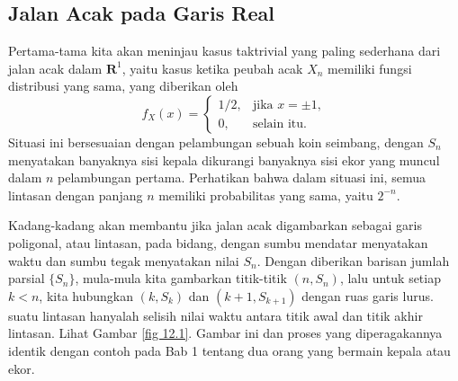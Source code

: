 \subsection*{Jalan Acak pada Garis Real}
Pertama-tama kita akan meninjau kasus taktrivial yang paling sederhana
dari jalan acak dalam ${\mathbf R}^1$, yaitu kasus ketika peubah acak $X_n$
memiliki fungsi distribusi yang sama, yang diberikan oleh
$$
f_X(x) = \left \{ \begin{array}{ll}
                        1/2, & \mbox{jika $x = \pm 1,$} \\
                          0, & \mbox{selain itu.} 
                  \end{array}
         \right.  
$$
Situasi ini bersesuaian dengan pelambungan sebuah koin seimbang, dengan $S_n$ menyatakan banyaknya
sisi kepala dikurangi banyaknya sisi ekor yang muncul dalam $n$ pelambungan pertama.  Perhatikan bahwa dalam
situasi ini, semua lintasan dengan panjang $n$ memiliki probabilitas yang sama, yaitu $2^{-n}$.
\par
Kadang-kadang akan membantu jika jalan acak digambarkan sebagai garis poligonal, atau lintasan, pada
bidang, dengan sumbu mendatar menyatakan waktu dan sumbu tegak menyatakan nilai
$S_n$.  Dengan diberikan barisan jumlah parsial $\{S_n\}$, mula-mula kita gambarkan titik-titik $(n, S_n)$, lalu
untuk setiap $k < n$, kita hubungkan $(k, S_k)$ dan $(k+1, S_{k+1})$ dengan ruas garis lurus.
 suatu lintasan hanyalah selisih nilai waktu antara titik awal
dan titik akhir lintasan.  Lihat Gambar \ref{fig 12.1}.  Gambar ini
dan proses yang diperagakannya identik dengan contoh pada Bab
1 tentang dua orang yang bermain kepala atau ekor.
